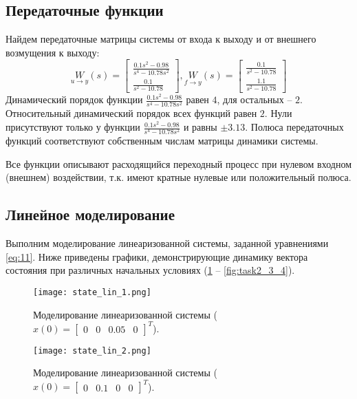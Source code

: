 \subsection{Передаточные функции}
Найдем передаточные матрицы системы от входа к выходу и от внешнего возмущения к выходу:
\begin{equation*}
    \underset{u\to y}{W}(s) = \begin{bmatrix}
        \frac{0.1s^2 - 0.98}{s^4 - 10.78s^2} \\
        \frac{0.1}{s^2 - 10.78}
    \end{bmatrix}, 
    \underset{f\to y}{W}(s) = \begin{bmatrix}
        \frac{0.1}{s^2 - 10.78} \\
        \frac{1.1}{s^2 - 10.78}
    \end{bmatrix}
\end{equation*}
Динамический порядок функции $\frac{0.1s^2 - 0.98}{s^4 - 10.78s^2}$ равен $4$, для остальных -- $2$. Относительный динамический порядок всех функций равен $2$.
Нули присутствуют только у функции $\frac{0.1s^2 - 0.98}{s^4 - 10.78s^2}$ и равны $\pm 3.13$. Полюса передаточных функций соответствуют собственным числам матрицы динамики системы.

Все функции описывают расходящийся переходный процесс при нулевом входном (внешнем) воздействии, т.к. имеют кратные нулевые или положительный полюса.

\subsection{Линейное моделирование}
Выполним моделирование линеаризованной системы, заданной уравнениями \ref{eq:11}.
Ниже приведены графики, демонстрирующие динамику вектора состояния при различных начальных условиях (\ref{fig:task2_3_1} -- \ref{fig:task2_3_4}).

\begin{figure}[]
    \centering
    \texttt{[image: state\_lin\_1.png]}
    \caption{\label{fig:task2_3_1}Моделирование линеаризованной системы ($x(0)=\begin{bmatrix}
        0 & 0 & 0.05 & 0
    \end{bmatrix}^T$).}
\end{figure}

\begin{figure}[]
    \centering
    \texttt{[image: state\_lin\_2.png]}
    \caption{\label{fig:task2_3_2}Моделирование линеаризованной системы ($x(0)=\begin{bmatrix}
        0 & 0.1 & 0 & 0
    \end{bmatrix}^T$).}
\end{figure}

